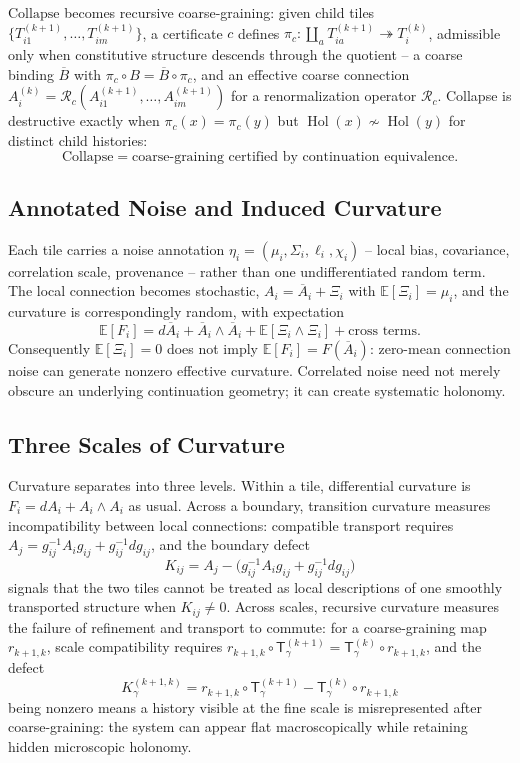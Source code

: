 \documentclass[11pt]{article}
\newcommand{\Hol}{\operatorname{Hol}}
\newcommand{\Collapse}{\mathrm{Collapse}}
\begin{document}
$\Collapse$ becomes recursive coarse-graining: given child tiles $\{T_{i1}^{(k+1)}, \ldots, T_{im}^{(k+1)}\}$, a certificate $c$ defines $\pi_c : \coprod_a T_{ia}^{(k+1)} \twoheadrightarrow T_i^{(k)}$, admissible only when constitutive structure descends through the quotient -- a coarse binding $\overline{B}$ with $\pi_c \circ B = \overline{B} \circ \pi_c$, and an effective coarse connection $A_i^{(k)} = \mathcal{R}_c(A_{i1}^{(k+1)}, \ldots, A_{im}^{(k+1)})$ for a renormalization operator $\mathcal{R}_c$. Collapse is destructive exactly when $\pi_c(x) = \pi_c(y)$ but $\Hol(x) \not\sim \Hol(y)$ for distinct child histories:
\[
\Collapse = \text{coarse-graining certified by continuation equivalence.}
\]

\subsection{Annotated Noise and Induced Curvature}

Each tile carries a noise annotation $\eta_i = (\mu_i, \Sigma_i, \ell_i, \chi_i)$ -- local bias, covariance, correlation scale, provenance -- rather than one undifferentiated random term. The local connection becomes stochastic, $A_i = \overline{A}_i + \Xi_i$ with $\mathbb{E}[\Xi_i] = \mu_i$, and the curvature is correspondingly random, with expectation
\[
\mathbb{E}[F_i] = d\overline{A}_i + \overline{A}_i \wedge \overline{A}_i + \mathbb{E}[\Xi_i \wedge \Xi_i] + \text{cross terms}.
\]
Consequently $\mathbb{E}[\Xi_i] = 0$ does not imply $\mathbb{E}[F_i] = F(\overline{A}_i)$: zero-mean connection noise can generate nonzero effective curvature. Correlated noise need not merely obscure an underlying continuation geometry; it can create systematic holonomy.

\subsection{Three Scales of Curvature}

Curvature separates into three levels. Within a tile, differential curvature is $F_i = dA_i + A_i \wedge A_i$ as usual. Across a boundary, transition curvature measures incompatibility between local connections: compatible transport requires $A_j = g_{ij}^{-1} A_i g_{ij} + g_{ij}^{-1} dg_{ij}$, and the boundary defect
\[
K_{ij} = A_j - \bigl( g_{ij}^{-1} A_i g_{ij} + g_{ij}^{-1} dg_{ij} \bigr)
\]
signals that the two tiles cannot be treated as local descriptions of one smoothly transported structure when $K_{ij} \neq 0$. Across scales, recursive curvature measures the failure of refinement and transport to commute: for a coarse-graining map $r_{k+1,k}$, scale compatibility requires $r_{k+1,k} \circ \mathsf{T}^{(k+1)}_\gamma = \mathsf{T}^{(k)}_\gamma \circ r_{k+1,k}$, and the defect
\[
K_\gamma^{(k+1,k)} = r_{k+1,k} \circ \mathsf{T}^{(k+1)}_\gamma - \mathsf{T}^{(k)}_\gamma \circ r_{k+1,k}
\]
being nonzero means a history visible at the fine scale is misrepresented after coarse-graining: the system can appear flat macroscopically while retaining hidden microscopic holonomy.
\end{document}
